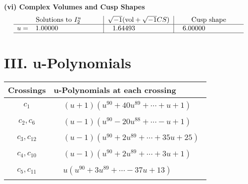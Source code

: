 \documentclass[1p]{elsarticle_modified}
\theoremstyle{definition}
\newcommand{\I}{\sqrt{-1}}
\begin{document}
\newpage\flushleft \textbf{(vi) Complex Volumes and Cusp Shapes}
$$\begin{array}{c|c|c}  
\text{Solutions to }I^u_{2}& \I (\text{vol} + \sqrt{-1}CS) & \text{Cusp shape}\\
 \hline 
\begin{aligned}
u &= \phantom{-}1.00000\phantom{ +0.000000I}\end{aligned}
 & \phantom{-}1.64493\phantom{ +0.000000I} & \phantom{-}6.00000\phantom{ +0.000000I}\\
 \hline 
 \end{array}$$\newpage
\newpage\renewcommand{\arraystretch}{1}
\centering \section*{ III. u-Polynomials}
\begin{tabular}{m{50pt}|m{274pt}}
Crossings & \hspace{64pt}u-Polynomials at each crossing \\
\hline $$\begin{aligned}c_{1}\end{aligned}$$&$\begin{aligned}
&(u+1)(u^{90}+40 u^{89}+\cdots+u+1)
\end{aligned}$\\
\hline $$\begin{aligned}c_{2},c_{6}\end{aligned}$$&$\begin{aligned}
&(u-1)(u^{90}-20 u^{88}+\cdots- u+1)
\end{aligned}$\\
\hline $$\begin{aligned}c_{3},c_{12}\end{aligned}$$&$\begin{aligned}
&(u-1)(u^{90}+2 u^{89}+\cdots+35 u+25)
\end{aligned}$\\
\hline $$\begin{aligned}c_{4},c_{10}\end{aligned}$$&$\begin{aligned}
&(u-1)(u^{90}+2 u^{89}+\cdots+3 u+1)
\end{aligned}$\\
\hline $$\begin{aligned}c_{5},c_{11}\end{aligned}$$&$\begin{aligned}
&u(u^{90}+3 u^{89}+\cdots-37 u+13)
\end{aligned}$\\

\end{tabular}
\end{document}
